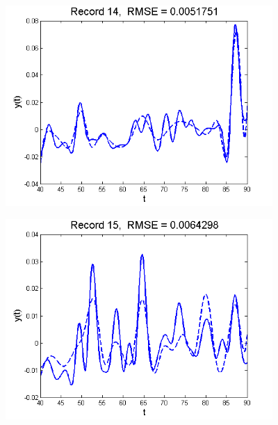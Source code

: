 \documentclass[11pt]{beamer}
\begin{document}
\begin{frame}

\begin{center}
\includegraphics[width=4in]{figs/SelTIC_fit14.png}
\end{center}

\end{frame}


\begin{frame}

\begin{center}
\includegraphics[width=4in]{figs/SelTIC_fit15.png}
\end{center}

\end{frame}

\end{document}

